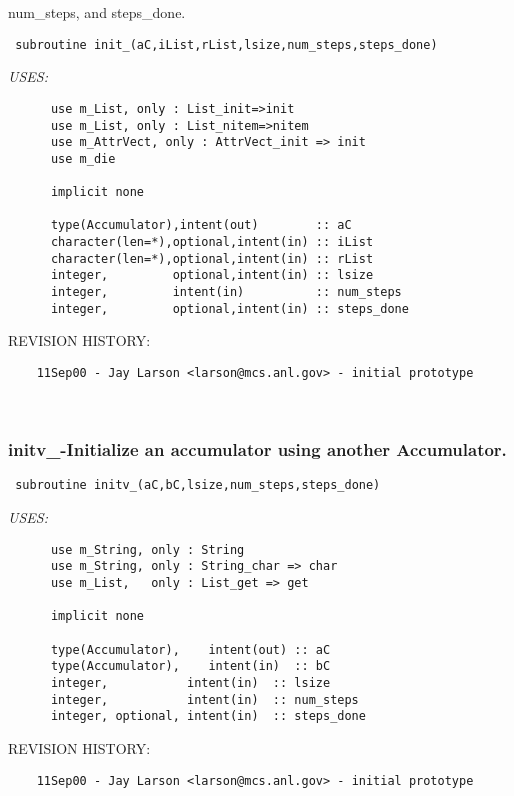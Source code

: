   num\_steps, and steps\_done.
 
 
\begin{verbatim} 
 subroutine init_(aC,iList,rList,lsize,num_steps,steps_done)\end{verbatim}{\em USES:}
\begin{verbatim}      use m_List, only : List_init=>init
      use m_List, only : List_nitem=>nitem
      use m_AttrVect, only : AttrVect_init => init
      use m_die
 
      implicit none
 
      type(Accumulator),intent(out)        :: aC
      character(len=*),optional,intent(in) :: iList
      character(len=*),optional,intent(in) :: rList
      integer,         optional,intent(in) :: lsize
      integer,         intent(in)          :: num_steps
      integer,         optional,intent(in) :: steps_done
 \end{verbatim}{\sf REVISION HISTORY:}
\begin{verbatim}  	11Sep00 - Jay Larson <larson@mcs.anl.gov> - initial prototype\end{verbatim}
 
 
\mbox{}\hrulefill\ 
 

 \subsubsection{initv\_-Initialize an accumulator using another Accumulator.}


 
 
\begin{verbatim} 
 subroutine initv_(aC,bC,lsize,num_steps,steps_done)\end{verbatim}{\em USES:}
\begin{verbatim}      use m_String, only : String
      use m_String, only : String_char => char
      use m_List,   only : List_get => get
 
      implicit none
 
      type(Accumulator),    intent(out) :: aC
      type(Accumulator),    intent(in)  :: bC
      integer,           intent(in)  :: lsize
      integer,           intent(in)  :: num_steps
      integer, optional, intent(in)  :: steps_done
 \end{verbatim}{\sf REVISION HISTORY:}
\begin{verbatim}  	11Sep00 - Jay Larson <larson@mcs.anl.gov> - initial prototype\end{verbatim}
 
